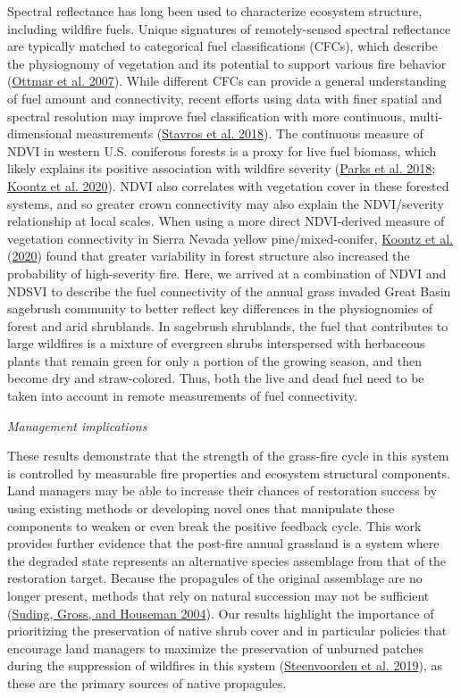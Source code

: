 \documentclass[
  12pt,
]{article}
\begin{document}
Spectral reflectance has long been used to characterize ecosystem
structure, including wildfire fuels. Unique signatures of
remotely-sensed spectral reflectance are typically matched to
categorical fuel classifications (CFCs), which describe the physiognomy
of vegetation and its potential to support various fire behavior
(\protect\hyperlink{ref-Ottmar2007}{Ottmar et al. 2007}). While
different CFCs can provide a general understanding of fuel amount and
connectivity, recent efforts using data with finer spatial and spectral
resolution may improve fuel classification with more continuous,
multi-dimensional measurements
(\protect\hyperlink{ref-Stavros2018}{Stavros et al. 2018}). The
continuous measure of NDVI in western U.S. coniferous forests is a proxy
for live fuel biomass, which likely explains its positive association
with wildfire severity (\protect\hyperlink{ref-Parks2018}{Parks et al.
2018}; \protect\hyperlink{ref-Koontz2020}{Koontz et al. 2020}). NDVI
also correlates with vegetation cover in these forested systems, and so
greater crown connectivity may also explain the NDVI/severity
relationship at local scales. When using a more direct NDVI-derived
measure of vegetation connectivity in Sierra Nevada yellow
pine/mixed-conifer, \protect\hyperlink{ref-Koontz2020}{Koontz et al.}
(\protect\hyperlink{ref-Koontz2020}{2020}) found that greater
variability in forest structure also increased the probability of
high-severity fire. Here, we arrived at a combination of NDVI and NDSVI
to describe the fuel connectivity of the annual grass invaded Great
Basin sagebrush community to better reflect key differences in the
physiognomies of forest and arid shrublands. In sagebrush shrublands,
the fuel that contributes to large wildfires is a mixture of evergreen
shrubs interspersed with herbaceous plants that remain green for only a
portion of the growing season, and then become dry and straw-colored.
Thus, both the live and dead fuel need to be taken into account in
remote measurements of fuel connectivity.

\emph{Management implications}

These results demonstrate that the strength of the grass-fire cycle in
this system is controlled by measurable fire properties and ecosystem
structural components. Land managers may be able to increase their
chances of restoration success by using existing methods or developing
novel ones that manipulate these components to weaken or even break the
positive feedback cycle. This work provides further evidence that the
post-fire annual grassland is a system where the degraded state
represents an alternative species assemblage from that of the
restoration target. Because the propagules of the original assemblage
are no longer present, methods that rely on natural succession may not
be sufficient (\protect\hyperlink{ref-Suding2004}{Suding, Gross, and
Houseman 2004}). Our results highlight the importance of prioritizing
the preservation of native shrub cover and in particular policies that
encourage land managers to maximize the preservation of unburned patches
during the suppression of wildfires in this system
(\protect\hyperlink{ref-Steenvoorden2019}{Steenvoorden et al. 2019}), as
these are the primary sources of native propagules.
\end{document}
